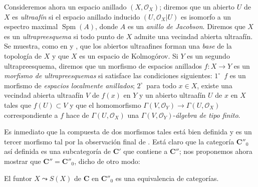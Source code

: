 
\begin{env}[10.9.5]
\label{IV.10.9.5}
Consideremos ahora un espacio anillado $(X,\mathcal O_X)$; diremos que un abierto $U$ de $X$ es \emph{ultraafín} si el espacio anillado inducido $(U,\mathcal O_X|U)$ es isomorfo a un espectro maximal $\operatorname{Spm}(A)$, donde $A$ es un \emph{anillo de Jacobson}.
Diremos que $X$ es un \emph{ultrapreesquema} si todo punto de $X$ admite una vecindad abierta ultraafín.
Se muestra, como en  y , que los abiertos ultraafines forman una \emph{base} de la topología de $X$ y que $X$ es un espacio de Kolmogórov.
Si $Y$ es un segundo ultrapreesquema, diremos que un morfismo de espacios anillados $f:X\to Y$ es un \emph{morfismo de ultrapreesquemas} si satisface las condiciones siguientes: $1^\circ$~$f$ es un morfismo de \emph{espacios localmente anillados}; $2^\circ$~para todo $x\in X$, existe una vecindad abierta ultraafín $V$ de $f(x)$ en $Y$ y un abierto ultraafín $U$ de $x$ en $X$ tales que $f(U)\subset V$ y que el homomorfismo $\Gamma(V,\mathcal O_Y)\to\Gamma(U,\mathcal O_X)$ correspondiente a $f$ hace de $\Gamma(U,\mathcal O_X)$ una $\Gamma(V,\mathcal O_Y)$-\emph{álgebra de tipo finito}.

Es inmediato que la compuesta de dos morfismos tales está bien definida y es un tercer morfismo tal por la observación final de .
Está claro que la categoría $\boldsymbol{C}''_0$ así definida es una subcategoría de $\boldsymbol{C}'$ que contiene a $\boldsymbol{C}''$; nos proponemos ahora mostrar que $\boldsymbol{C}''=\boldsymbol{C}''_0$, dicho de otro modo:
\end{env}

\begin{proposition}[10.9.6]
\label{IV.10.9.6}
El funtor $X\leadsto S(X)$ de $\boldsymbol{C}$ en $\boldsymbol{C}''_0$ es una equivalencia de categorías.
\end{proposition}

